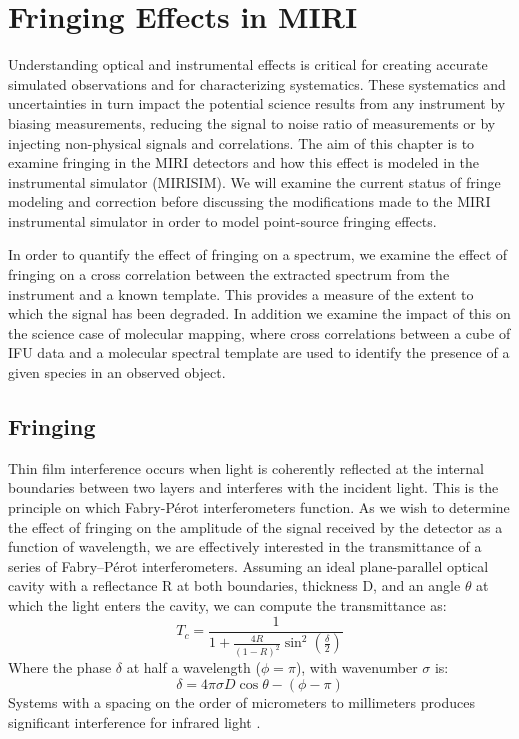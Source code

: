 \chapter{Fringing Effects in MIRI}\label{ch:fringe}
Understanding optical and instrumental effects is critical for creating accurate simulated observations and for characterizing systematics. 
These systematics and uncertainties in turn impact the potential science results from any instrument by biasing measurements, reducing the signal to noise ratio of measurements or by injecting non-physical signals and correlations.
The aim of this chapter is to examine fringing in the MIRI detectors and how this effect is modeled in the instrumental simulator (MIRISIM). 
We will examine the current status of fringe modeling and correction before discussing the modifications made to the MIRI instrumental simulator in order to model point-source fringing effects.

In order to quantify the effect of fringing on a spectrum, we examine the effect of fringing on a cross correlation between the extracted spectrum from the instrument and a known template. 
This provides a measure of the extent to which the signal has been degraded.
In addition we examine the impact of this on the science case of molecular mapping, where cross correlations between a cube of IFU data and a molecular spectral template are used to identify the presence of a given species in an observed object. 

\section{Fringing}
Thin film interference occurs when light is coherently reflected at the internal boundaries between two layers and interferes with the incident light.
This is the principle on which Fabry-P\'{e}rot interferometers function.
As we wish to determine the effect of fringing on the amplitude of the signal received by the detector as a function of wavelength, we are effectively interested in the transmittance of a series of Fabry--P\'{e}rot interferometers. 
Assuming an ideal plane-parallel optical cavity with a reflectance R at both boundaries, thickness D, and an angle $\theta$ at which the light enters the cavity, we can compute the transmittance as:
\begin{equation}\label{eqn:trans}
T_{c} = \frac{1}{1+\frac{4R}{\left(1-R\right)^{2}}\sin^{2}\left(\frac{\delta}{2}\right)}
\end{equation}
Where the phase $\delta$ at half a wavelength ($\phi = \pi$), with wavenumber $\sigma$ is:
\begin{equation}\label{eqn:phase}
\delta = 4\pi\sigma D \cos\theta - (\phi - \pi)
\end{equation}
Systems with a spacing on the order of micrometers to millimeters produces significant interference for infrared light \parencite{Lahuis2003}.


